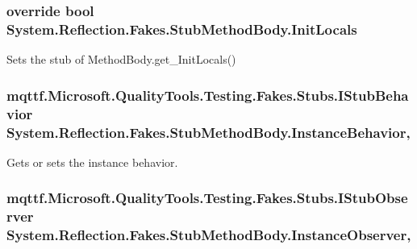 \hypertarget{class_system_1_1_reflection_1_1_fakes_1_1_stub_method_body_a0e0e54fe2e5fb0233edfb8f7fe3f8dc7}{
\subsubsection[{Init\-Locals}]{\setlength{\rightskip}{0pt plus 5cm}override bool System.\-Reflection.\-Fakes.\-Stub\-Method\-Body.\-Init\-Locals\hspace{0.3cm}{\ttfamily [get]}}}\label{class_system_1_1_reflection_1_1_fakes_1_1_stub_method_body_a0e0e54fe2e5fb0233edfb8f7fe3f8dc7}


Sets the stub of Method\-Body.\-get\-\_\-\-Init\-Locals()

\hypertarget{class_system_1_1_reflection_1_1_fakes_1_1_stub_method_body_a59cf4caa5e120abe0a50ebd8552f4612}{
\subsubsection[{Instance\-Behavior}]{\setlength{\rightskip}{0pt plus 5cm}mqttf.\-Microsoft.\-Quality\-Tools.\-Testing.\-Fakes.\-Stubs.\-I\-Stub\-Behavior System.\-Reflection.\-Fakes.\-Stub\-Method\-Body.\-Instance\-Behavior\hspace{0.3cm}{\ttfamily [get]}, {\ttfamily [set]}}}\label{class_system_1_1_reflection_1_1_fakes_1_1_stub_method_body_a59cf4caa5e120abe0a50ebd8552f4612}


Gets or sets the instance behavior.

\hypertarget{class_system_1_1_reflection_1_1_fakes_1_1_stub_method_body_a4fb050cc65f417b21c8f6b2c694c490e}{
\subsubsection[{Instance\-Observer}]{\setlength{\rightskip}{0pt plus 5cm}mqttf.\-Microsoft.\-Quality\-Tools.\-Testing.\-Fakes.\-Stubs.\-I\-Stub\-Observer System.\-Reflection.\-Fakes.\-Stub\-Method\-Body.\-Instance\-Observer\hspace{0.3cm}{\ttfamily [get]}, {\ttfamily [set]}}}\label{class_system_1_1_reflection_1_1_fakes_1_1_stub_method_body_a4fb050cc65f417b21c8f6b2c694c490e}


